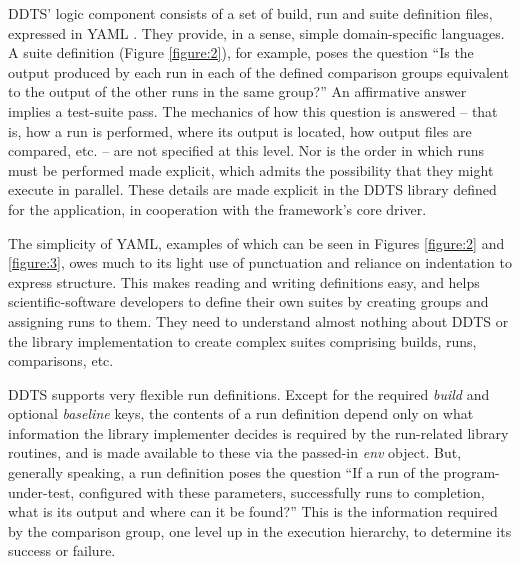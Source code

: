 \documentclass[conference]{IEEEtran}
\begin{document}
DDTS' logic component consists of a set of build, run and suite definition files, expressed in YAML \cite{yaml}. They provide, in a sense, simple domain-specific languages. A suite definition (Figure \ref{figure:2}), for example, poses the question ``Is the output produced by each run in each of the defined comparison groups equivalent to the output of the other runs in the same group?'' An affirmative answer implies a test-suite pass. The mechanics of how this question is answered -- that is, how a run is performed, where its output is located, how output files are compared, etc. -- are not specified at this level. Nor is the order in which runs must be performed made explicit, which admits the possibility that they might execute in parallel. These details are made explicit in the DDTS library defined for the application, in cooperation with the framework's core driver.

The simplicity of YAML, examples of which can be seen in Figures \ref{figure:2} and \ref{figure:3}, owes much to its light use of punctuation and reliance on indentation to express structure. This makes reading and writing definitions easy, and helps scientific-software developers to define their own suites by creating groups and assigning runs to them. They need to understand almost nothing about DDTS or the library implementation to create complex suites comprising builds, runs, comparisons, etc.

DDTS supports very flexible run definitions. Except for the required \emph{build} and optional \emph{baseline} keys, the contents of a run definition depend only on what information the library implementer decides is required by the run-related library routines, and is made available to these via the passed-in \emph{env} object. But, generally speaking, a run definition poses the question ``If a run of the program-under-test, configured with these parameters, successfully runs to completion, what is its output and where can it be found?'' This is the information required by the comparison group, one level up in the execution hierarchy, to determine its success or failure.
\end{document}
